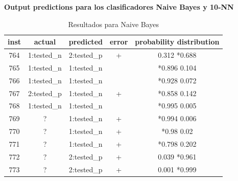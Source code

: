 \documentclass[es]{ifirak}
\begin{document}
\textbf{Output predictions para los clasificadores Naive Bayes y 10-NN}

\begin{table}[htbp]
		\centering
		\begin{tabular}{|c|c|l|c|c|}
			inst &   actual    & predicted   & error & probability  distribution \\ \hline
			764  & 1:tested\_n & 2:tested\_p &   +   &    0.312    \hspace{0.4cm}    *0.688    \\
			765  & 1:tested\_n & 1:tested\_n &       &   *0.896    \hspace{0.4cm}    0.104     \\
			766  & 1:tested\_n & 1:tested\_n &       &   *0.928   \hspace{0.4cm}     0.072     \\
			767  & 2:tested\_p & 1:tested\_n &   +   &   *0.858   \hspace{0.4cm}     0.142     \\
			768  & 1:tested\_n & 1:tested\_n &       &   *0.995   \hspace{0.4cm}     0.005     \\
			769  &      ?      & 1:tested\_n &   +   &   *0.994   \hspace{0.4cm}     0.006     \\
			770  &      ?      & 1:tested\_n &   +   &   *0.98   \hspace{0.4cm}      0.02     \\
			771  &      ?      & 1:tested\_n &   +   &   *0.798   \hspace{0.4cm}     0.202     \\
			772  &      ?      & 2:tested\_p &   +   &    0.039   \hspace{0.4cm}    *0.961    \\
			773  &      ?      & 2:tested\_p &   +   &    0.001    \hspace{0.4cm}   *0.999
		\end{tabular}
	\caption{Resultados para Naive Bayes }\label{table}
\end{table}
\end{document}
